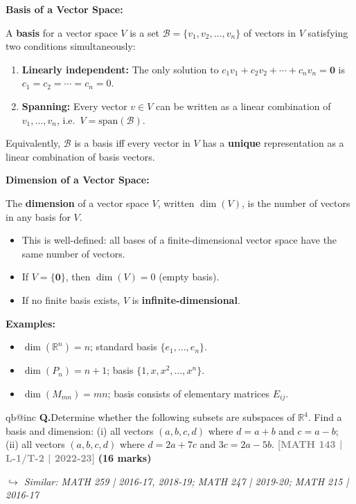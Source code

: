 \documentclass[12pt,a3paper]{article}
\makeatletter
\newcommand{\yr}[1]{\hfill\textcolor{gray}{\small\textbf{[#1]}}}
\newcommand{\mk}[1]{\textcolor{orange!70!black}{\small\textbf{(#1 marks)}}}
\newcommand{\variant}[1]{\par\vspace{1pt}\textcolor{blue!50!black}%
  {\footnotesize\textit{$\hookrightarrow$ Similar: #1}}}
\newcounter{qnum}
\newcommand{\Q}[1]{%
  \csname qb@inc\endcsname
  \needspace{4\baselineskip}
  \refstepcounter{qnum}
  \vspace{6pt}
  \noindent\textbf{Q\theqnum.}\enspace #1\par
}
\makeatother
\begin{document}
\begin{tcolorbox}[enhanced,breakable,colback=cC!4,colframe=cC,
  boxrule=0.8pt,arc=5pt,
  title={\textbf{Answer}},
  fonttitle=\bfseries\color{white},colbacktitle=cC]

\textbf{Basis of a Vector Space:}

A \textbf{basis} for a vector space $V$ is a set $\mathcal{B}=\{v_1,v_2,\ldots,v_n\}$ of vectors in $V$ satisfying two conditions simultaneously:
\begin{enumerate}[label=(\roman*),itemsep=2pt]
  \item \textbf{Linearly independent:} The only solution to $c_1v_1+c_2v_2+\cdots+c_nv_n=\mathbf{0}$ is $c_1=c_2=\cdots=c_n=0$.
  \item \textbf{Spanning:} Every vector $v\in V$ can be written as a linear combination of $v_1,\ldots,v_n$, i.e.\ $V=\mathrm{span}(\mathcal{B})$.
\end{enumerate}

Equivalently, $\mathcal{B}$ is a basis iff every vector in $V$ has a \textbf{unique} representation as a linear combination of basis vectors.

\medskip
\textbf{Dimension of a Vector Space:}

The \textbf{dimension} of a vector space $V$, written $\dim(V)$, is the number of vectors in any basis for $V$.

\begin{itemize}[itemsep=2pt]
  \item This is well-defined: all bases of a finite-dimensional vector space have the same number of vectors.
  \item If $V=\{\mathbf{0}\}$, then $\dim(V)=0$ (empty basis).
  \item If no finite basis exists, $V$ is \textbf{infinite-dimensional}.
\end{itemize}

\textbf{Examples:}
\begin{itemize}[itemsep=2pt]
  \item $\dim(\mathbb{R}^n)=n$; standard basis $\{e_1,\ldots,e_n\}$.
  \item $\dim(P_n)=n+1$; basis $\{1,x,x^2,\ldots,x^n\}$.
  \item $\dim(M_{mn})=mn$; basis consists of elementary matrices $E_{ij}$.
\end{itemize}
\end{tcolorbox}

\Q{Determine whether the following subsets are subspaces of $\mathbb{R}^4$. Find a basis and dimension: (i) all vectors $(a,b,c,d)$ where $d = a+b$ and $c = a-b$; (ii) all vectors $(a,b,c,d)$ where $d = 2a+7c$ and $3c = 2a-5b$.
\yr{MATH 143 | L-1/T-2 | 2022-23} \mk{16}
\variant{MATH 259 | 2016-17, 2018-19; MATH 247 | 2019-20; MATH 215 | 2016-17}}
\end{document}
